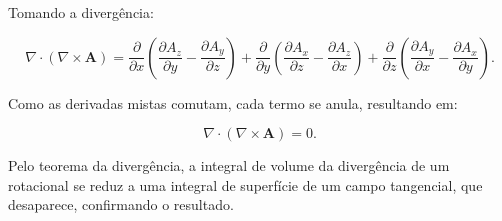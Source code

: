 \documentclass[a4paper,12pt]{article}
\newcommand{\printingbibliography}{%

    \pagestyle{myheadings}
    \markright{}
    \sloppy
    \printbibliography[heading=bibintoc, %
                   title=Refer\^encias %
                  ]
    \fussy%
}
\begin{document}
Tomando a divergência:

\begin{equation}
    \nabla \cdot (\nabla \times \mathbf{A}) = \frac{\partial}{\partial x} \left( \frac{\partial A_z}{\partial y} - \frac{\partial A_y}{\partial z} \right) + 
    \frac{\partial}{\partial y} \left( \frac{\partial A_x}{\partial z} - \frac{\partial A_z}{\partial x} \right) + 
    \frac{\partial}{\partial z} \left( \frac{\partial A_y}{\partial x} - \frac{\partial A_x}{\partial y} \right).
\end{equation}

Como as derivadas mistas comutam, cada termo se anula, resultando em:

\begin{equation}
    \nabla \cdot (\nabla \times \mathbf{A}) = 0.
\end{equation}

Pelo teorema da divergência, a integral de volume da divergência de um rotacional se reduz a uma integral de superfície de um campo tangencial, que desaparece, confirmando o resultado.



\end{document}
